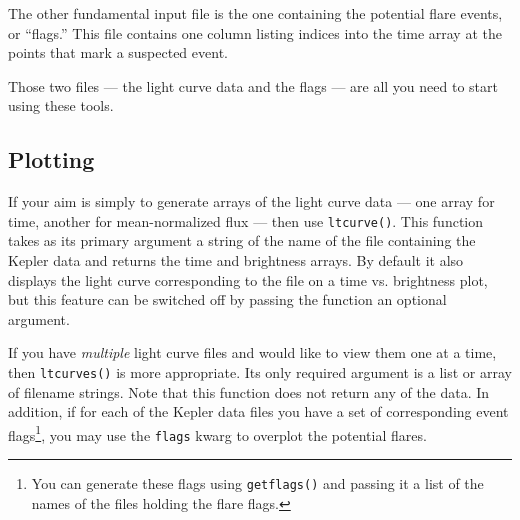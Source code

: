 \documentclass[11pt]{article}
\begin{document}
The other fundamental input file is the one containing the potential
flare events, or ``flags.''  This file contains one column listing
indices into the time array at the points that mark a suspected event.


Those two files --- the light curve data and the flags --- are all you
need to start using these tools.


\subsection{Plotting}
\label{sec:basic}

If your aim is simply to generate arrays of the light curve data ---
one array for time, another for mean-normalized flux --- then use
\verb|ltcurve()|.  This function takes as its primary argument a
string of the name of the file containing the Kepler data and returns
the time and brightness arrays.  By default it also displays the light
curve corresponding to the file on a time vs. brightness plot, but
this feature can be switched off by passing the function an optional
argument.

If you have \emph{multiple} light curve files and would like to view
them one at a time, then \verb|ltcurves()| is more appropriate.  Its
only required argument is a list or array of filename strings.  Note
that this function does not return any of the data.  In addition, if
for each of the Kepler data files you have a set of corresponding
event flags\footnote{You can generate these flags using
  \texttt{getflags()} and passing it a list of the names of the files
  holding the flare flags.}, you may use the \verb|flags| kwarg to
overplot the potential flares.
\end{document}
